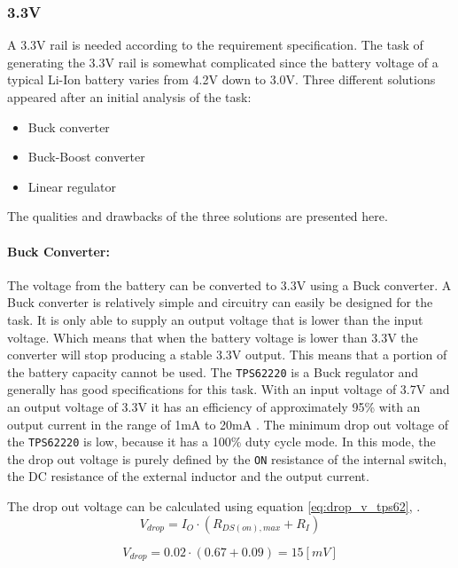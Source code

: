\subsubsection{3.3V}
A 3.3V rail is needed according to the requirement specification.
The task of generating the 3.3V rail is somewhat complicated since the battery voltage of a typical Li-Ion battery varies from 4.2V down to 3.0V.
Three different solutions appeared after an initial analysis of the task:

\begin{itemize}
	\item Buck converter
	\item Buck-Boost converter
	\item Linear regulator
\end{itemize}

The qualities and drawbacks of the three solutions are presented here.

\paragraph{Buck Converter:}
The voltage from the battery can be converted to 3.3V using a Buck converter.
A Buck converter is relatively simple and circuitry can easily be designed for the task.
It is only able to supply an output voltage that is lower than the input voltage.
Which means that when the battery voltage is lower than 3.3V the converter will stop producing a stable 3.3V output.
This means that a portion of the battery capacity cannot be used.
The \texttt{TPS62220} is a Buck regulator and generally has good specifications for this task. 
With an input voltage of 3.7V and an output voltage of 3.3V it has an efficiency of approximately 95\% with an output current in the range of 1mA to 20mA \cite{TPS6222}.
The minimum drop out voltage of the \texttt{TPS62220} is low, because it has a 100\% duty cycle mode.
In this mode, the the drop out voltage is purely defined by the \texttt{ON} resistance of the internal switch, the DC resistance of the external inductor and the output current.

The drop out voltage can be calculated using equation \ref{eq:drop_v_tps62}, \cite{TPS6222}.
\begin{equation}
	V_{drop} = I_{O} \cdot (R_{DS(on),max}+R_I)
	\label{eq:drop_v_tps62}
\end{equation}

\begin{equation}
	V_{drop} = 0.02 \cdot (0.67+0.09) = 15 [mV]
	\label{eq:drop_v_tps62_2}
\end{equation}

